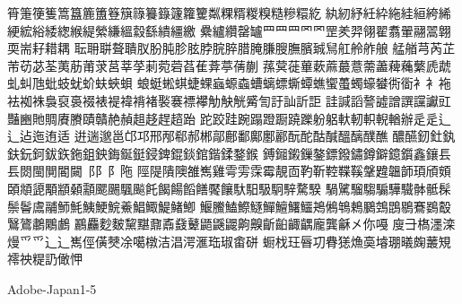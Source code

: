 筲箑箯篗篙簋簏簠簦簱簶籑籙籧籮籰粼粿糈糉糗糙糝糫紇
紈紉紓紝紣絁絓絙絝絺綆綋綌緌緫緱緹縈縑縕縠繇繢繮繳
纍纑纘罄罏⺫⺲罒⺱罓罡羑羿翎翟翥翬翮翯翺耎耑耔耤耦
耺耼聠聱聵肞肦肫胗胘脖脘脺腊腌膁膄膴臏臹舃舡舲舴艆
艋艏芎芮芷芾苆苾荃荑荕莆莍莒莘莩莿菀菪萏萑葊葶蒨蒯
蓀蓂蓰蓽蔌蔴蕞薏薷藎薭蘒蘩虒虣虬虯虺蚍蚑蚘蚧蚨蛺蛽
蜋蜓蜙蜞蜨蜾蝱螈螙螬螭螵蟖蟫蟭蠁蠆蠋蠔蠜衖衟⻂衤袘
袪袽袾裊裒裛裰裱褆褘褙褚褧褰褾襻觔觖觥觱訇訏訕訢詎
詿諴謟謷譃譄譔讜讞豇豔豳貤賙賡賸賾贛赩赬趄趍趕趦跆
跎跤跬踠蹋蹬蹰蹺躒躮躳軑軔軹輗輶辦⾡辵⻍辶迠迤迶适
逬遄邈邕邙邛邢邴郗郝郴鄗鄜鄱鄺鄽酈酛酡酤醎醞醨醭醮
醲醼釰釷釻鈇鈨鈳鈸鉃鉇鉏鉠鋂鋋鋌鋟錍錕錟錧鍇鍒鍪鍭
鎛鎺鎩鏁鏊鏢鏺鏽鐏鐴鐿鑕鑫鑲⻒镸閦閩閴閽闚⻏⻖阝陁
陘隄隤隩雒嶲雞雩雱霂霉靚靣靮靳鞚鞢鞵鞶韙韞韴頊頎頞
頣頫頾顒顓顙顬颸颺颿飈飥餲餳饀饍饜饟馱馹馺駉騂騖騤
騧騭騮騶騸驊驖骵骶髹鬃鬠鬳鬴魳魹鮧鯁鯇鯗鯧鯫鯷鯺鯽
鰋鰧鰪鰶鱁鱓鱣鱰鱷鴂鵂鵇鵣鵩鵼鵾鶍鶱鷃鷇鷖鷟鷫鷴鸕
鸝麤麨麬黧黮鼐鼒鼗鼙鼯鼷鼹齁齅齗齨齱齵龐龔龢㐅你嘠
廋⺕𣘺濹滦熳⺤爫⻌辶嶲俓僙僰凃噶橔洁淐湂滙珤琡畬硑
蟵𣏾玨㫳㓛䐌㺊龽䯨龼㻚㬢龾䕺䂓䙥䄃䊓䚮㒈𢘉

Adobe-Japan1-5

